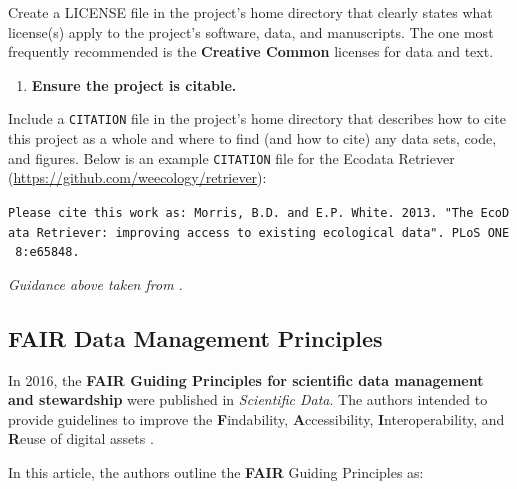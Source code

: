 \documentclass[
]{book}
\providecommand{\tightlist}{%
  \setlength{\itemsep}{0pt}\setlength{\parskip}{0pt}}
\begin{document}
Create a LICENSE file in the project's home directory that clearly states what license(s) apply to the project's software, data, and manuscripts. The one most frequently recommended is the \textbf{Creative Common} licenses for data and text.

\begin{enumerate}
\def\labelenumi{\arabic{enumi}.}
\setcounter{enumi}{4}
\tightlist
\item
  \textbf{Ensure the project is citable.}
\end{enumerate}

Include a \texttt{CITATION} file in the project's home directory that describes how to cite this project as a whole and where to find (and how to cite) any data sets, code, and figures. Below is an example \texttt{CITATION} file for the Ecodata Retriever (\url{https://github.com/weecology/retriever}):

\texttt{Please\ cite\ this\ work\ as:\ Morris,\ B.D.\ and\ E.P.\ White.\ 2013.\ "The\ EcoData\ Retriever:\ improving\ access\ to\ existing\ ecological\ data".\ PLoS\ ONE\ 8:e65848.}

\emph{Guidance above taken from \citet{Wilson_2017}.}

\hypertarget{fair-data-management-principles}{%
\subsection{FAIR Data Management Principles}\label{fair-data-management-principles}}

In 2016, the \textbf{FAIR Guiding Principles for scientific data management and stewardship} were published in \emph{Scientific Data}. The authors intended to provide guidelines to improve the \textbf{F}indability, \textbf{A}ccessibility, \textbf{I}nteroperability, and \textbf{R}euse of digital assets \citep{Wilkinson_2016}.

In this article, the authors outline the \textbf{FAIR} Guiding Principles as:
\end{document}
